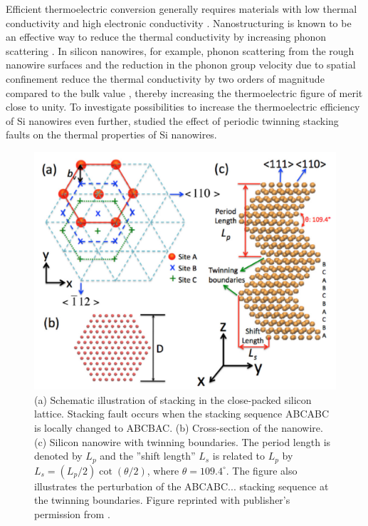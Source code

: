\label{sec:results_twinning}

Efficient thermoelectric conversion generally requires materials with low thermal conductivity and high electronic conductivity \cite{majumdar04}. Nanostructuring is known to be an effective way to reduce the thermal conductivity by increasing phonon scattering \cite{vineis10,shakouri11}. In silicon nanowires, for example, phonon scattering from the rough nanowire surfaces and the reduction in the phonon group velocity due to spatial confinement \cite{balandin98} reduce the thermal conductivity by two orders of magnitude compared to the bulk value \cite{hochbaum08,boukai08}, thereby increasing the thermoelectric figure of merit \cite{chen} close to unity. To investigate possibilities to increase the thermoelectric efficiency of Si nanowires even further,  studied the effect of periodic twinning stacking faults \cite{algra08,caroff09} on the thermal properties of Si nanowires.


\begin{figure}[tb]
 \begin{center}
  \includegraphics[width=.89\columnwidth]{pics/twinning_fig1.pdf} 
  \caption{(a) Schematic illustration of stacking in the close-packed silicon lattice. Stacking fault occurs when the stacking sequence ABCABC is locally changed to ABCBAC. (b) Cross-section of the nanowire. (c) Silicon nanowire with twinning boundaries. The period length is denoted by $L_p$ and the ''shift length'' $L_s$ is related to $L_p$ by $L_s=(L_p/2)\cot(\theta/2)$, where $\theta=109.4^{\circ}$. The figure also illustrates the perturbation of the ABCABC... stacking sequence at the twinning boundaries. Figure reprinted with publisher's permission from .}  
\label{fig:twinning_fig1}
 \end{center}
\end{figure}

